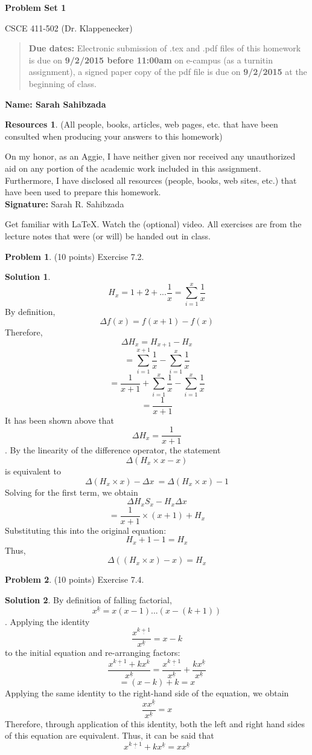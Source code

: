 \documentclass{article}
\theoremstyle{definition}
\newtheorem{problem}{Problem}
\newtheorem*{solution}{Solution}
\newtheorem*{resources}{Resources}
\newcommand{\name}[1]{\noindent\textbf{Name: Sarah Sahibzada}}
\newcommand{\honor}{\noindent On my honor, as an Aggie, I have neither
  given nor received any unauthorized aid on any portion of the
  academic work included in this assignment. Furthermore, I have
  disclosed all resources (people, books, web sites, etc.) that have
  been used to prepare this homework. \\[1ex]
 \textbf{Signature:} Sarah R. Sahibzada }
\newcommand{\problemset}[1]{\begin{center}\textbf{Problem Set #1}\end{center}}
\newcommand{\duedate}[2]{\begin{quote}\textbf{Due dates:} Electronic submission of .tex
    and .pdf files of this homework is due on \textbf{#1} on e-campus
    (as a turnitin assignment), a signed paper copy
    of the pdf file is due on \textbf{#2} at the beginning of
    class. \end{quote} }
\begin{document}
\problemset{1}
\centerline{CSCE 411-502 (Dr. Klappenecker) }

\duedate{9/2/2015 before 11:00am}{9/2/2015}
\name{ (put your name here)}
\begin{resources} (All people, books, articles, web pages, etc. that
  have been consulted when producing your answers to this homework)
\end{resources}
\honor

\newpage

Get familiar with \LaTeX. Watch the (optional) video. All exercises
are from the lecture notes that were (or will) be handed out in
class. 
\begin{problem} (10 points)
Exercise 7.2. 
\end{problem}
\begin{solution}
\[H_{x} = 1 + 2 + . . . \frac{1}{x} = \sum\limits_{i=1}^x \frac{1}{x}\]
By definition, \[\Delta f(x) = f(x+1) - f(x) \]
Therefore, \[\Delta H_{x} = H_{x+1} - H_{x}\]
\[=\sum\limits_{i=1}^{x+1} \frac{1}{x} - \sum\limits_{i=1}^x \frac{1}{x}\]
\[=\frac{1}{x+1} + \sum\limits_{i=1}^x \frac{1}{x} - \sum\limits_{i=1}^x \frac{1}{x} \]
\[=\frac{1}{x+1}\]
It has been shown above that \[\Delta H_{x} = \frac{1}{x+1} \] . 
By the linearity of the difference operator, the statement \[\Delta (H_{x}\times x-x)\] is equivalent to \[\Delta (H_{x}\times x) - \Delta x\ = \Delta (H_{x}\times x) -1\]
Solving for the first term, we obtain \[\Delta H_{x}S_{x}- H_{x} \Delta{x}\]
\[= \frac{1}{x+1}\times (x+1) + H_{x}\]
Substituting this into the original equation:
\[H_{x} + 1 - 1 = H_{x}\]
Thus,\[\Delta((H_{x}\times x) - x) = H_{x}\]

\end{solution}

\begin{problem} (10 points)
Exercise 7.4.
\end{problem}
\begin{solution}

By definition of falling factorial, \[x^{\underline{k}} = x(x-1)...(x-(k+1))\].
Applying the identity \[\frac{x^{\underline{k+1}}}{x^{\underline{k}}} = x - k\] to the initial equation and re-arranging factors:\[\frac{x^{\underline{k+1}} + kx^{k}}{x^{\underline{k}}}  = \frac{x^{\underline{k+1}}}{x^{\underline{k}}} + \frac{kx^{\underline{k}}}{x^{\underline{k}}}\]
\[= (x - k) + k = x\]
Applying the same identity to the right-hand side of the equation, we obtain \[\frac{xx^{\underline{k}}}{x^{\underline{k}}} = x\]
Therefore, through application of this identity, both the left and right hand sides of this equation are equivalent. Thus, it can be said that \[x^{\underline{k+1}}+kx^{\underline{k}} = xx^{\underline{k}}\]
\end{solution}
\end{document}
